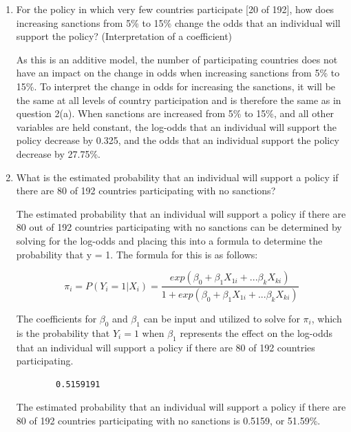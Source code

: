 \documentclass[12pt,letterpaper]{article}
\begin{document}
\begin{enumerate}
\begin{enumerate}
	\item
	For the policy in which very few countries participate [20 of 192], how does increasing sanctions from 5\% to 15\% change the odds that an individual will support the policy? (Interpretation of a coefficient)
	\vspace{.25cm}
			
	\noindent As this is an additive model, the number of participating countries does not have an impact on the change in odds when increasing sanctions from 5\% to 15\%. To interpret the change in odds for increasing the sanctions, it will be the same at all levels of country participation and is therefore the same as in question 2(a). When sanctions are increased from 5\% to 15\%, and all other variables are held constant, the log-odds that an individual will support the policy decrease by 0.325, and the odds that an individual support the policy decrease by 27.75\%. 
	\vspace{.25cm}
			
	\item
	What is the estimated probability that an individual will support a policy if there are 80 of 192 countries participating with no sanctions? 
	\vspace{.25cm}
			
	\noindent The estimated probability that an individual will support a policy if there are 80 out of 192 countries participating with no sanctions can be determined by solving for the log-odds and placing this into a formula to determine the probability that y = 1. The formula for this is as follows:
	
	\[\pi_{i} = P(Y_{i} = 1| X_{i}) = \frac{exp(\beta_{0} + \beta_{1}X_{1i} + ... \beta_{k}X_{ki})}{1 + exp(\beta_{0} + \beta_{1}X_{1i} + ... \beta_{k}X_{ki})}\]
	
	\noindent The coefficients for $\beta_{0}$ and $\beta_{1}$ can be input and utilized to solve for $\pi_{i}$, which is the probability that $Y_{i} = 1$ when $\beta_{1}$ represents the effect on the log-odds that an individual will support a policy if there are 80 of 192 countries participating.
		
	
	
	\begin{verbatim}
		0.5159191 
	\end{verbatim}
		
	\noindent The estimated probability that an individual will support a policy if there are 80 of 192 countries participating with no sanctions is 0.5159, or 51.59\%.
		

\end{enumerate}
\end{enumerate}
\end{document}
